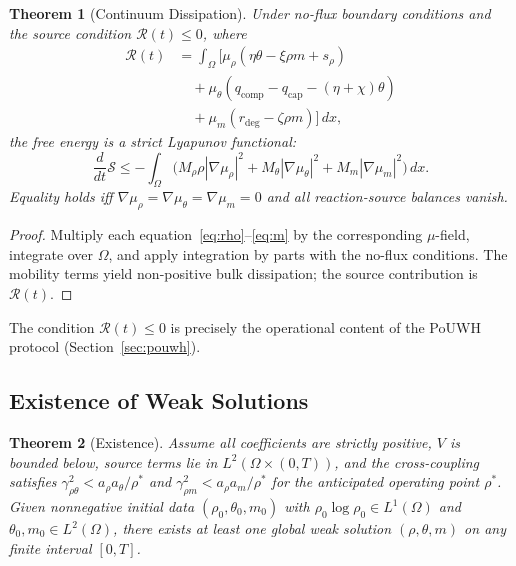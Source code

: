 \documentclass[10pt,twocolumn]{article}
\theoremstyle{plain}
\newtheorem{theorem}{Theorem}
\theoremstyle{definition}
\theoremstyle{remark}
\begin{document}
\begin{theorem}[Continuum Dissipation]
\label{thm:dissipation}
Under no-flux boundary conditions and the source condition
$\mathcal{R}(t) \leq 0$, where
\begin{align*}
\mathcal{R}(t) &= \int_\Omega \big[\mu_\rho(\eta\theta - \xi\rho m + s_\rho)\\
&\quad + \mu_\theta(q_{\mathrm{comp}} - q_{\mathrm{cap}} - (\eta+\chi)\theta)\\
&\quad + \mu_m(r_{\mathrm{deg}} - \zeta\rho m)\big]\,dx,
\end{align*}
the free energy is a strict Lyapunov functional:
\[
  \frac{d}{dt}\mathcal{S} \leq
  -\int_\Omega\!\big(M_\rho\rho|\nabla\mu_\rho|^2
  + M_\theta|\nabla\mu_\theta|^2 + M_m|\nabla\mu_m|^2\big)\,dx.
\]
Equality holds iff $\nabla\mu_\rho = \nabla\mu_\theta = \nabla\mu_m = 0$
and all reaction-source balances vanish.
\end{theorem}

\begin{proof}
Multiply each equation~\eqref{eq:rho}--\eqref{eq:m} by the
corresponding $\mu$-field, integrate over $\Omega$, and apply
integration by parts with the no-flux conditions. The mobility terms
yield non-positive bulk dissipation; the source contribution is
$\mathcal{R}(t)$.
\end{proof}

The condition $\mathcal{R}(t) \leq 0$ is precisely the operational
content of the PoUWH protocol (Section~\ref{sec:pouwh}).

\subsection{Existence of Weak Solutions}

\begin{theorem}[Existence]
\label{thm:existence}
Assume all coefficients are strictly positive, $V$ is bounded below,
source terms lie in $L^2(\Omega \times (0,T))$, and the cross-coupling
satisfies $\gamma_{\rho\theta}^2 < a_\rho a_\theta / \rho^*$ and
$\gamma_{\rho m}^2 < a_\rho a_m / \rho^*$ for the anticipated operating
point $\rho^*$. Given nonnegative initial data
$(\rho_0,\theta_0,m_0)$ with $\rho_0 \log\rho_0 \in L^1(\Omega)$ and
$\theta_0, m_0 \in L^2(\Omega)$, there exists at least one global weak
solution $(\rho,\theta,m)$ on any finite interval $[0,T]$.
\end{theorem}
\end{document}
